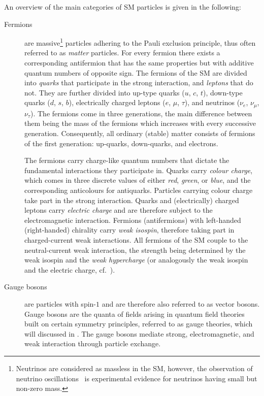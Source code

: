 An overview of the main categories of SM particles is given in the following:
\begin{description}

\item[Fermions] are massive\footnote{Neutrinos are considered as massless in the
    SM, however, the observation of neutrino
    oscillations~\cite{Super-Kamiokande:1998kpq,SNO:2002tuh} is experimental
    evidence for neutrinos having small but non-zero mass.} particles adhering
  to the Pauli exclusion principle, thus often referred to as \emph{matter}
  particles. For every fermion there exists a corresponding antifermion that has
  the same properties but with additive quantum numbers of opposite sign. The
  fermions of the SM are divided into \emph{quarks} that participate in the
  strong interaction, and \emph{leptons} that do not. They are further divided
  into up-type quarks ($u$, $c$, $t$), down-type quarks ($d$, $s$, $b$),
  electrically charged leptons ($e$, $\mu$, $\tau$), and neutrinos ($\nu_e$,
  $\nu_\mu$, $\nu_\tau$). The fermions come in three generations, the main
  difference between them being the mass of the fermions which increases with
  every successive generation. Consequently, all ordinary (stable) matter
  consists of fermions of the first generation: up-quarks, down-quarks, and
  electrons.

  The fermions carry charge-like quantum numbers that dictate the fundamental
  interactions they participate in. Quarks carry \emph{colour charge}, which
  comes in three discrete values of either \emph{red}, \emph{green}, or
  \emph{blue}, and the corresponding anticolours for antiquarks. Particles
  carrying colour charge take part in the strong interaction. Quarks and
  (electrically) charged leptons carry \emph{electric charge} and are therefore
  subject to the electromagnetic interaction. Fermions (antifermions) with
  left-handed (right-handed) chirality carry \emph{weak isospin}, therefore
  taking part in charged-current weak interactions. All fermions of the SM
  couple to the neutral-current weak interaction, the strength being determined
  by the weak isospin and the \emph{weak hypercharge} (or analogously the weak
  isospin and the electric charge, cf.~).

\item[Gauge bosons] are particles with spin-$1$ and are therefore also referred
  to as vector bosons. Gauge bosons are the quanta of fields arising in quantum
  field theories built on certain symmetry principles, referred to as gauge
  theories, which will discussed in . The
  gauge bosons mediate strong, electromagnetic, and weak interaction through
  particle exchange.


\end{description}
